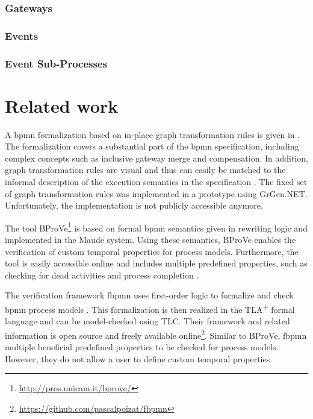 \documentclass[adraft, copyright, creativecommons]{eptcs} %
\begin{document}
\subsubsection{Gateways}
\subsubsection{Events}

\subsubsection{Event Sub-Processes}

\section{Related work}
A \gls*{bpmn} formalization based on in-place graph transformation rules is given in \cite{vangorpVisualTokenbasedFormalization2013}.
The formalization covers a substantial part of the \gls*{bpmn} specification, including complex concepts such as inclusive gateway merge and compensation.
In addition, graph transformation rules are visual and thus can easily be matched to the informal description of the execution semantics in the specification \cite{objectmanagementgroupBusinessProcessModel2013}.
The fixed set of graph transformation rules was implemented in a prototype using GrGen.NET.
Unfortunately, the implementation is not publicly accessible anymore.

The tool BProVe\footnote{\url{http://pros.unicam.it/bprove/}} is based on formal \gls*{bpmn} semantics given in rewriting logic and implemented in the Maude system.
Using these semantics, BProVe enables the verification of custom temporal properties for process models.
Furthermore, the tool is easily accessible online and includes multiple predefined properties, such as checking for dead activities and process completion \cite{corradiniBProVeToolSupport2017, corradiniFormalApproachAnalysis2021}.

The verification framework \textsf{fbpmn} uses first-order logic to formalize and check \gls*{bpmn} process models \cite{houhouFirstOrderLogicSemantics2019, houhouFirstOrderLogicVerification2022}.
This formalization is then realized in the TLA\textsuperscript{+} formal language and can be model-checked using TLC.
Their framework and related information is open source and freely available online\footnote{\url{https://github.com/pascalpoizat/fbpmn}}.
Similar to BProVe, \textsf{fbpmn} multiple beneficial predefined properties to be checked for process models.
However, they do not allow a user to define custom temporal properties.
\end{document}

